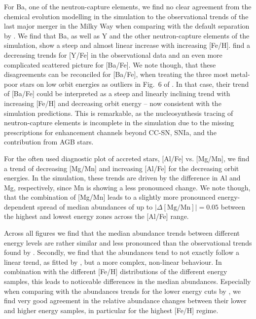 \documentclass[fleqn,usenatbib]{mnras}
\begin{document}
For Ba, one of the neutron-capture elements, we find no clear agreement from the chemical evolution modelling in the simulation to the observational trends of the last major merger in the Milky Way when comparing with the default separation by \citet[][their Fig.~6]{Skuladottir2025}. We find that Ba, as well as Y and the other neutron-capture elements of the simulation, show a steep and almost linear increase with increasing [Fe/H]. \citet{Skuladottir2025} find a decreasing trends for [Y/Fe] in the observational data and an even more complicated scattered picture for [Ba/Fe]. We note though, that these disagreements can be reconciled for [Ba/Fe], when treating the three most metal-poor stars on low orbit energies as outliers in Fig.~6 of \citet{Skuladottir2025}. In that case, their trend of [Ba/Fe] could be interpreted as a steep and linearly inclining trend with increasing [Fe/H] and decreasing orbit energy -- now consistent with the simulation predictions. This is remarkable, as the nucleosynthesis tracing of neutron-capture elements is incomplete in the simulation due to the missing prescriptions for enhancement channels beyond CC-SN, SNIa, and the contribution from AGB stars.

For the often used diagnostic plot of accreted stars, [Al/Fe] vs. [Mg/Mn], we find a trend of decreasing [Mg/Mn] and increasing [Al/Fe] for the decreasing orbit energies. In the simulation, these trends are driven by the difference in Al and Mg, respectively, since Mn is showing a less pronounced change. We note though, that the combination of [Mg/Mn] leads to a slightly more pronounced energy-dependent spread of median abundances of up to $\vert\Delta\mathrm{[Mg/Mn]}\vert = 0.05$ between the highest and lowest energy zones across the [Al/Fe] range.

Across all figures we find that the median abundance trends between different energy levels are rather similar and less pronounced than the observational trends found by \citet{Skuladottir2025}. Secondly, we find that the abundances tend to not exactly follow a linear trend, as fitted by \citet{Skuladottir2025}, but a more complex, non-linear behaviour. In combination with the different [Fe/H] distributions of the different energy samples, this leads to noticeable differences in the median abundances. Especially when comparing with the abundances trends for the lower energy cuts by \citet[][their Fig.~5]{Skuladottir2025}, we find very good agreement in the relative abundance changes between their lower and higher energy samples, in particular for the highest [Fe/H] regime.
\end{document}
